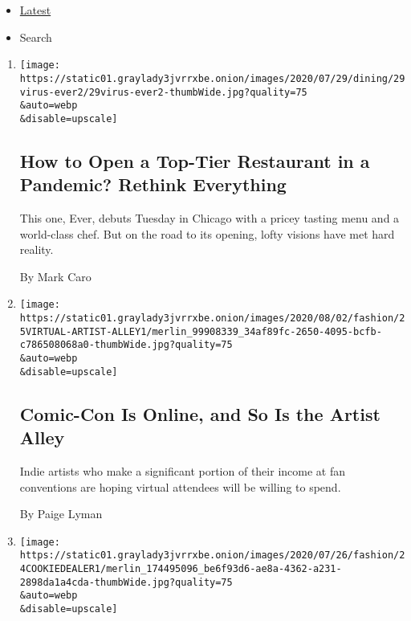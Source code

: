 \begin{itemize}
\tightlist
\item
  \protect\hyperlink{stream-panel}{Latest}
\item
  Search
\end{itemize}

\begin{enumerate}
\def\labelenumi{\arabic{enumi}.}
\item
  \href{/2020/07/28/dining/ever-chicago-restaurant-coronavirus.html}{}

  \texttt{[image: https://static01.graylady3jvrrxbe.onion/images/2020/07/29/dining/29virus-ever2/29virus-ever2-thumbWide.jpg?quality=75\\\&auto=webp\\\&disable=upscale]}

  \hypertarget{how-to-open-a-top-tier-restaurant-in-a-pandemic-rethink-everything}{%
  \subsection{How to Open a Top-Tier Restaurant in a Pandemic? Rethink
  Everything}\label{how-to-open-a-top-tier-restaurant-in-a-pandemic-rethink-everything}}

  This one, Ever, debuts Tuesday in Chicago with a pricey tasting menu
  and a world-class chef. But on the road to its opening, lofty visions
  have met hard reality.

  By Mark Caro
\item
  \href{/2020/07/25/style/comic-con-online-artist-alley.html}{}

  \texttt{[image: https://static01.graylady3jvrrxbe.onion/images/2020/08/02/fashion/25VIRTUAL-ARTIST-ALLEY1/merlin\_99908339\_34af89fc-2650-4095-bcfb-c786508068a0-thumbWide.jpg?quality=75\\\&auto=webp\\\&disable=upscale]}

  \hypertarget{comic-con-is-online-and-so-is-the-artist-alley}{%
  \subsection{Comic-Con Is Online, and So Is the Artist
  Alley}\label{comic-con-is-online-and-so-is-the-artist-alley}}

  Indie artists who make a significant portion of their income at fan
  conventions are hoping virtual attendees will be willing to spend.

  By Paige Lyman
\item
  \href{/2020/07/24/style/my-cookie-dealer-instagram.html}{}

  \texttt{[image: https://static01.graylady3jvrrxbe.onion/images/2020/07/26/fashion/24COOKIEDEALER1/merlin\_174495096\_be6f93d6-ae8a-4362-a231-2898da1a4cda-thumbWide.jpg?quality=75\\\&auto=webp\\\&disable=upscale]}


\end{enumerate}
